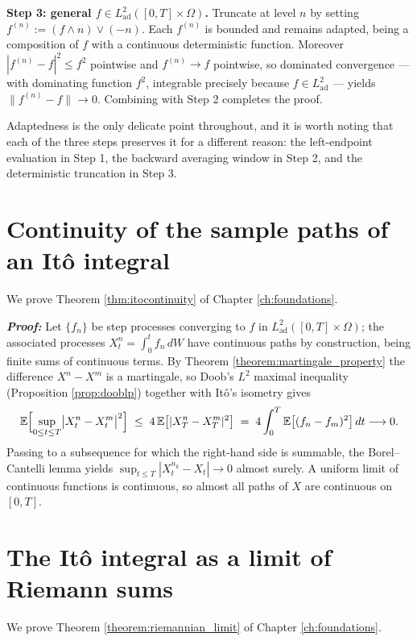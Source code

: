 \medskip
\noindent\textbf{Step 3: general $f \in L^2_{\mathrm{ad}}([0,T]\times\Omega)$.} Truncate at level $n$ by
setting $f^{(n)} := (f \wedge n) \vee (-n)$. Each $f^{(n)}$ is bounded and remains adapted, being a
composition of $f$ with a continuous deterministic function. Moreover $|f^{(n)} - f|^2 \leq f^2$
pointwise and $f^{(n)} \to f$ pointwise, so dominated convergence --- with dominating function $f^2$,
integrable precisely because $f \in L^2_{\mathrm{ad}}$ --- yields $\lVert f^{(n)} - f\rVert \to 0$. Combining
with Step 2 completes the proof.

\medskip
\noindent Adaptedness is the only delicate point throughout, and it is worth noting that each of the
three steps preserves it for a different reason: the left-endpoint evaluation in Step 1, the backward
averaging window in Step 2, and the deterministic truncation in Step 3. \qedfilledtext

\section{Continuity of the sample paths of an Itô integral}\label{app:proof:itocontinuity}
We prove Theorem \ref{thm:itocontinuity} of Chapter \ref{ch:foundations}.

\textbf{\textit{Proof:}} Let $\{f_n\}$ be step processes converging to $f$ in
$L^2_{\mathrm{ad}}([0,T]\times\Omega)$; the associated processes $X^n_t = \int_0^t f_n\,dW$ have continuous
paths by construction, being finite sums of continuous terms. By Theorem
\ref{theorem:martingale_property} the difference $X^n - X^m$ is a martingale, so Doob's $L^2$
maximal inequality (Proposition \ref{prop:dooblp}) together with Itô's isometry gives
\[
\mathbb{E}\Bigl[\sup_{0\leq t\leq T}\bigl|X^n_t - X^m_t\bigr|^2\Bigr]
\;\leq\; 4\,\mathbb{E}\bigl[|X^n_T - X^m_T|^2\bigr]
\;=\; 4\int_0^T \mathbb{E}\bigl[(f_n - f_m)^2\bigr]\,dt \longrightarrow 0 .
\]
Passing to a subsequence for which the right-hand side is summable, the Borel--Cantelli lemma yields
$\sup_{t\leq T}|X^{n_k}_t - X_t| \to 0$ almost surely. A uniform limit of continuous functions is
continuous, so almost all paths of $X$ are continuous on $[0,T]$. \qedfilledtext

\section{The Itô integral as a limit of Riemann sums}\label{app:proof:riemannlimit}
We prove Theorem \ref{theorem:riemannian_limit} of Chapter \ref{ch:foundations}.

